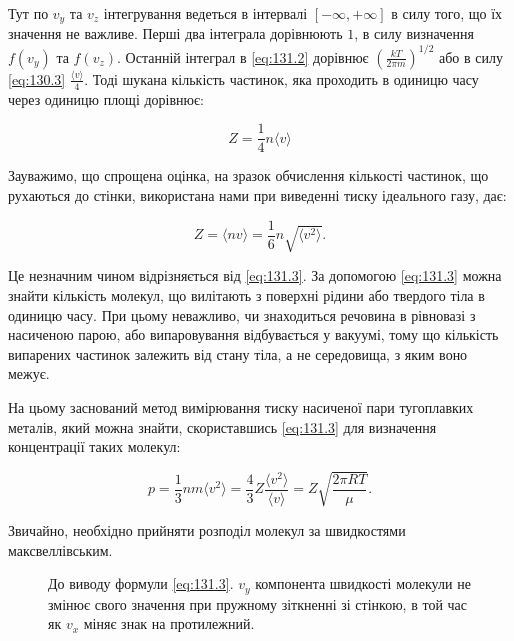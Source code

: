 Тут по $v_y$ та $v_z$ інтегрування ведеться в інтервалі $[-\infty, +\infty]$ в силу того, що їх значення не важливе. Перші два інтеграла дорівнюють $1$, в силу визначення $f(v_y)$ та $f(v_z)$. Останній інтеграл в \eqref{eq:131.2} дорівнює $\left(\frac{kT}{2\pi m}\right)^{1/2}$ або в силу \eqref{eq:130.3} $\frac{\langle v \rangle}{4}$. Тоді шукана кількість частинок, яка проходить в одиницю часу через одиницю площі дорівнює:

\begin{equation}\label{eq:131.3}
Z = \frac14 n\langle v \rangle
\end{equation}

Зауважимо, що спрощена оцінка, на зразок обчислення кількості частинок, що рухаються до стінки, використана нами при виведенні тиску ідеального газу, дає:

\begin{equation}
Z =\langle nv \rangle = \frac16 n \sqrt{\langle v^2 \rangle}.
\label{eq:131.4}
\end{equation}

Це незначним чином відрізняється від \eqref{eq:131.3}.
За допомогою \eqref{eq:131.3} можна знайти кількість молекул, що вилітають з поверхні рідини або твердого тіла в одиницю часу. При цьому неважливо, чи знаходиться речовина в рівновазі з насиченою парою, або випаровування відбувається у вакуумі, тому що кількість випарених частинок залежить від стану тіла, а не середовища, з яким воно межує.

На цьому заснований метод вимірювання тиску насиченої пари тугоплавких металів, який можна знайти, скориставшись \eqref{eq:131.3} для визначення концентрації таких молекул:

\begin{equation}
p = \frac13 nm \langle v^2 \rangle = \frac43 Z \frac{\langle v^2 \rangle}{\langle v \rangle} = Z \sqrt{\frac{2\pi RT}{\mu}}.
\label{eq:131.5}
\end{equation}

Звичайно, необхідно прийняти розподіл молекул за швидкостями максвеллівським.

\begin{figure}[h!]\centering

\caption{До виводу формули \eqref{eq:131.3}. $v_y$ компонента швидкості молекули не змінює свого значення при пружному зіткненні зі стінкою, в той час як $v_x$ міняє знак на протилежний.}
\label{pic:Pic13.4}
\end{figure}

